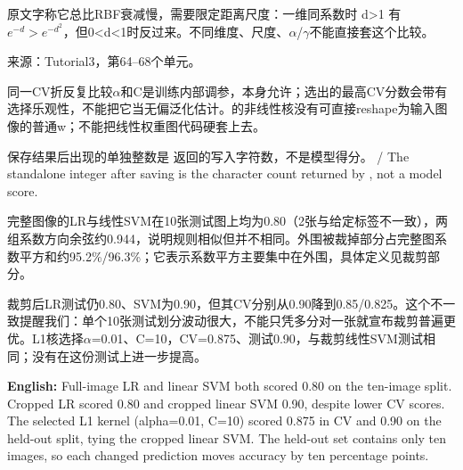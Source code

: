 原文字称它总比RBF衰减慢，需要限定距离尺度：一维同系数时 d>1 有 \(e^{-d}>e^{-d^2}\)，但0<d<1时反过来。不同维度、尺度、\ensuremath{\alpha}/\ensuremath{\gamma}不能直接套这个比较。


来源：Tutorial3，第64–68个单元。








同一CV折反复比较\ensuremath{\alpha}和C是训练内部调参，本身允许；选出的最高CV分数会带有选择乐观性，不能把它当无偏泛化估计。的非线性核没有可直接reshape为输入图像的普通w；不能把线性权重图代码硬套上去。











保存结果后出现的单独整数是  返回的写入字符数，不是模型得分。 / The standalone integer after saving is the character count returned by , not a model score.


完整图像的LR与线性SVM在10张测试图上均为0.80（2张与给定标签不一致），两组系数方向余弦约0.944，说明规则相似但并不相同。外围被裁掉部分占完整图系数平方和约95.2\%/96.3\%；它表示系数平方主要集中在外围，具体定义见裁剪部分。


裁剪后LR测试仍0.80、SVM为0.90，但其CV分别从0.90降到0.85/0.825。这个不一致提醒我们：单个10张测试划分波动很大，不能只凭多分对一张就宣布裁剪普遍更优。L1核选择\ensuremath{\alpha}=0.01、C=10，CV=0.875、测试0.90，与裁剪线性SVM测试相同；没有在这份测试上进一步提高。


\textbf{English:} Full-image LR and linear SVM both scored 0.80 on the ten-image split. Cropped LR scored 0.80 and cropped linear SVM 0.90, despite lower CV scores. The selected L1 kernel (alpha=0.01, C=10) scored 0.875 in CV and 0.90 on the held-out split, tying the cropped linear SVM. The held-out set contains only ten images, so each changed prediction moves accuracy by ten percentage points.


